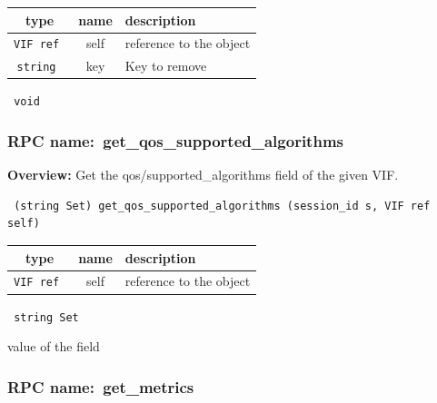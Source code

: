  
\vspace{0.3cm}
\begin{tabular}{|c|c|p{7cm}|}
 \hline
{\bf type} & {\bf name} & {\bf description} \\ \hline
{\tt VIF ref } & self & reference to the object \\ \hline 

{\tt string } & key & Key to remove \\ \hline 

\end{tabular}

\vspace{0.3cm}

{\tt 
void
}



\vspace{0.3cm}
\vspace{0.3cm}
\vspace{0.3cm}
\subsubsection{RPC name:~get\_qos\_supported\_algorithms}

{\bf Overview:} 
Get the qos/supported\_algorithms field of the given VIF.

\begin{verbatim} (string Set) get_qos_supported_algorithms (session_id s, VIF ref self)\end{verbatim}



 
\vspace{0.3cm}
\begin{tabular}{|c|c|p{7cm}|}
 \hline
{\bf type} & {\bf name} & {\bf description} \\ \hline
{\tt VIF ref } & self & reference to the object \\ \hline 

\end{tabular}

\vspace{0.3cm}

{\tt 
string Set
}


value of the field
\vspace{0.3cm}
\vspace{0.3cm}
\vspace{0.3cm}
\subsubsection{RPC name:~get\_metrics}

